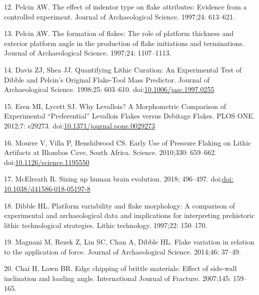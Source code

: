 \documentclass[10pt,letterpaper]{article}
\newenvironment{cslreferences}%
  {}%
  {\par}
\begin{document}
\begin{cslreferences}
\leavevmode\hypertarget{ref-pelcin_effect_1997-1}{}%
12. Pelcin AW. The effect of indentor type on flake attributes: Evidence
from a controlled experiment. Journal of Archaeological Science.
1997;24: 613--621.

\leavevmode\hypertarget{ref-pelcin_formation_1997}{}%
13. Pelcin AW. The formation of flakes: The role of platform thickness
and exterior platform angle in the production of flake initiations and
terminations. Journal of Archaeological Science. 1997;24: 1107--1113.

\leavevmode\hypertarget{ref-davis_quantifying_1998}{}%
14. Davis ZJ, Shea JJ. Quantifying Lithic Curation: An Experimental Test
of Dibble and Pelcin's Original Flake-Tool Mass Predictor. Journal of
Archaeological Science. 1998;25: 603--610.
doi:\href{https://doi.org/10.1006/jasc.1997.0255}{10.1006/jasc.1997.0255}

\leavevmode\hypertarget{ref-eren_why_2012}{}%
15. Eren MI, Lycett SJ. Why Levallois? A Morphometric Comparison of
Experimental ``Preferential'' Levallois Flakes versus Debitage Flakes.
PLOS ONE. 2012;7: e29273.
doi:\href{https://doi.org/10.1371/journal.pone.0029273}{10.1371/journal.pone.0029273}

\leavevmode\hypertarget{ref-mourre_early_2010}{}%
16. Mourre V, Villa P, Henshilwood CS. Early Use of Pressure Flaking on
Lithic Artifacts at Blombos Cave, South Africa. Science. 2010;330:
659--662.
doi:\href{https://doi.org/10.1126/science.1195550}{10.1126/science.1195550}

\leavevmode\hypertarget{ref-mcelreath_sizing_2018}{}%
17. McElreath R. Sizing up human brain evolution. 2018; 496--497.
doi:\href{https://doi.org/doi:\%2010.1038/d41586-018-05197-8}{doi: 10.1038/d41586-018-05197-8}

\leavevmode\hypertarget{ref-dibble_platform_1997}{}%
18. Dibble HL. Platform variability and flake morphology: A comparison
of experimental and archaeological data and implications for
interpreting prehistoric lithic technological strategies. Lithic
technology. 1997;22: 150--170.

\leavevmode\hypertarget{ref-magnani_flake_2014-1}{}%
19. Magnani M, Rezek Z, Lin SC, Chan A, Dibble HL. Flake variation in
relation to the application of force. Journal of Archaeological Science.
2014;46: 37--49.

\leavevmode\hypertarget{ref-chai_edge_2007}{}%
20. Chai H, Lawn BR. Edge chipping of brittle materials: Effect of
side-wall inclination and loading angle. International Journal of
Fracture. 2007;145: 159--165.


\end{cslreferences}
\end{document}

